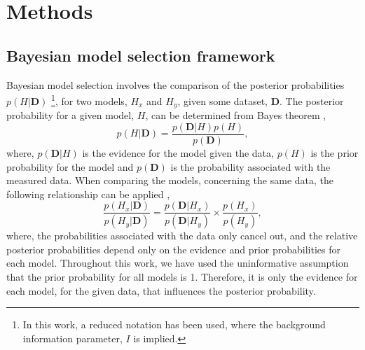 \documentclass[%
 reprint,
 superscriptaddress,
 amsmath,amssymb,
 aps,
]{revtex4-1}
\begin{document}
\section{\label{methods} Methods}

\subsection{\label{bayes_mod} Bayesian model selection framework}

Bayesian model selection involves the comparison of the posterior probabilities $p(H|\mathbf{D})$ \footnote{In this work, a reduced notation has been used, where the background information parameter, $I$ is implied.}, for two models, $H_x$ and $H_y$, given some dataset, $\bm{D}$. 
The posterior probability for a given model, $H$, can be determined from Bayes theorem \cite{bayes_essay_1763}, 
%
\begin{equation}
    p(H|\bm{D}) = \frac{p(\bm{D}|H)p(H)}{p(\bm{D})},
\end{equation}
%
where, $p(\bm{D}|H)$ is the evidence for the model given the data, $p(H)$ is the prior probability for the model and $p(\bm{D})$ is the probability associated with the measured data. 
When comparing the models, concerning the same data, the following relationship can be applied \cite{pullen_bayesian_2014}, 
%
\begin{equation}
    \frac{p(H_x|\bm{D})}{p(H_y|\bm{D})} = \frac{p(\bm{D}|H_x)}{p(\bm{D}|H_y)} \times \frac{p(H_x)}{p(H_y)},
    \label{equ:ratio}
\end{equation}
%
where, the probabilities associated with the data only cancel out, and the relative posterior probabilities depend only on the evidence and prior probabilities for each model. 
Throughout this work, we have used the uninformative assumption that the prior probability for all models is \num{1}.
Therefore, it is only the evidence for each model, for the given data, that influences the posterior probability. 
\end{document}
